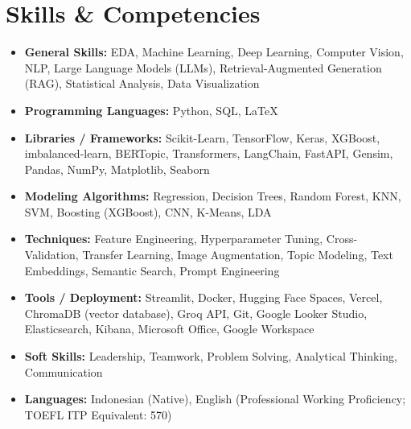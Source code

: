 \documentclass[letterpaper,10pt]{article}
\newcommand{\resumeItem}[1]{\item\small{#1}}
\newcommand{\resumeSubHeadingList}{\begin{itemize}[leftmargin=0.15in, label={}]}
\newcommand{\resumeSubHeadingListEnd}{\end{itemize}}
\begin{document}
\section{Skills \& Competencies}
\resumeSubHeadingList
  \resumeItem{\textbf{General Skills:} EDA, Machine Learning, Deep Learning, Computer Vision, NLP, Large Language Models (LLMs), Retrieval-Augmented Generation (RAG), Statistical Analysis, Data Visualization}
  \resumeItem{\textbf{Programming Languages:} Python, SQL, LaTeX}
  \resumeItem{\textbf{Libraries / Frameworks:} Scikit-Learn, TensorFlow, Keras, XGBoost, imbalanced-learn, BERTopic, Transformers, LangChain, FastAPI, Gensim, Pandas, NumPy, Matplotlib, Seaborn}
  \resumeItem{\textbf{Modeling Algorithms:} Regression, Decision Trees, Random Forest, KNN, SVM, Boosting (XGBoost), CNN, K-Means, LDA}
  \resumeItem{\textbf{Techniques:} Feature Engineering, Hyperparameter Tuning, Cross-Validation, Transfer Learning, Image Augmentation, Topic Modeling, Text Embeddings, Semantic Search, Prompt Engineering}
  \resumeItem{\textbf{Tools / Deployment:} Streamlit, Docker, Hugging Face Spaces, Vercel, ChromaDB (vector database), Groq API, Git, Google Looker Studio, Elasticsearch, Kibana, Microsoft Office, Google Workspace}
  \resumeItem{\textbf{Soft Skills:} Leadership, Teamwork, Problem Solving, Analytical Thinking, Communication}
  \resumeItem{\textbf{Languages:} Indonesian (Native), English (Professional Working Proficiency; TOEFL ITP Equivalent: 570)}
\resumeSubHeadingListEnd

\end{document}
